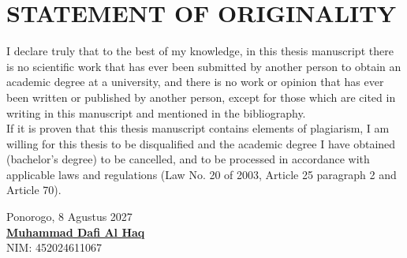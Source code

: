 \chapter*{STATEMENT OF ORIGINALITY}
\thispagestyle{empty}

I declare truly that to the best of my knowledge, in this thesis manuscript there is no scientific work that has ever been submitted by another person to obtain an academic degree at a university, and there is no work or opinion that has ever been written or published by another person, except for those which are cited in writing in this manuscript and mentioned in the bibliography.\\	%

If it is proven that this thesis manuscript contains elements of plagiarism, I am willing for this thesis to be disqualified and the academic degree I have obtained (bachelor's degree) to be cancelled, and to be processed in accordance with applicable laws and regulations (Law No. 20 of 2003, Article 25 paragraph 2 and Article 70).\\	%

\begin{flushright}
	\begin{minipage}{5cm} 
		Ponorogo, 8 Agustus 2027
		\vspace{3cm}\\
		\centering\textbf{\underline{Muhammad Dafi Al Haq}}\\	%
		\centering NIM: 452024611067\\	%
	\end{minipage}
\end{flushright}